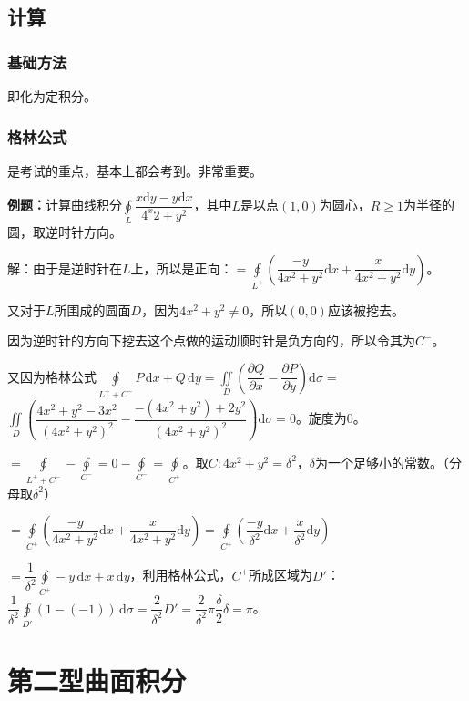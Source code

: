 \documentclass[UTF8, 12pt]{ctexart}
\begin{document}
\subsection{计算}

\subsubsection{基础方法}

即化为定积分。

\subsubsection{格林公式}

是考试的重点，基本上都会考到。非常重要。

\textbf{例题：}计算曲线积分$\oint\limits_L\dfrac{x\textrm{d}y-y\textrm{d}x}{4^x2+y^2}$，其中$L$是以点$(1,0)$为圆心，$R\geqslant1$为半径的圆，取逆时针方向。

解：由于是逆时针在$L$上，所以是正向：$=\displaystyle{\oint\limits_{L^+}\left(\dfrac{-y}{4x^2+y^2}\textrm{d}x+\dfrac{x}{4x^2+y^2}\textrm{d}y\right)}$。

又对于$L$所围成的圆面$D$，因为$4x^2+y^2\neq0$，所以$(0,0)$应该被挖去。

因为逆时针的方向下挖去这个点做的运动顺时针是负方向的，所以令其为$C^-$。

又因为格林公式$\oint\limits_{L^++C^-}P\,\textrm{d}x+Q\,\textrm{d}y=\displaystyle{\iint\limits_D\left(\dfrac{\partial Q}{\partial x}-\dfrac{\partial P}{\partial y}\right)\textrm{d}\sigma}=$\\$\displaystyle{\iint\limits_D\left(\dfrac{4x^2+y^2-3x^2}{(4x^2+y^2)^2}-\dfrac{-(4x^2+y^2)+2y^2}{(4x^2+y^2)^2}\right)\textrm{d}\sigma}=0$。旋度为0。

$=\oint\limits_{L^++C^-}-\oint\limits_{C^-}=0-\oint\limits_{C^-}=\oint\limits_{C^+}$。取$C:4x^2+y^2=\delta^2$，$\delta$为一个足够小的常数。（分母取$\delta^2$）

$=\displaystyle{\oint\limits_{C^+}\left(\dfrac{-y}{4x^2+y^2}\textrm{d}x+\dfrac{x}{4x^2+y^2}\textrm{d}y\right)}=\displaystyle{\oint\limits_{C^+}\left(\dfrac{-y}{\delta^2}\textrm{d}x+\dfrac{x}{\delta^2}\textrm{d}y\right)}$

$=\dfrac{1}{\delta^2}\oint\limits_{C^+}-y\,\textrm{d}x+x\,\textrm{d}y$，利用格林公式，$C^+$所成区域为$D'$：$\dfrac{1}{\delta^2}\oint\limits_{D'}(1-(-1))\,\textrm{d}\sigma=\dfrac{2}{\delta^2}D'=\dfrac{2}{\delta^2}\pi\dfrac{\delta}{2}\delta=\pi$。


\section{第二型曲面积分}
\end{document}
